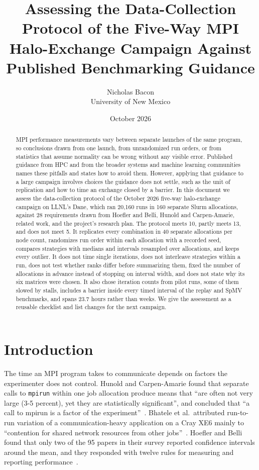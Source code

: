\documentclass[11pt]{article}
\title{Assessing the Data-Collection Protocol of the Five-Way MPI\\Halo-Exchange Campaign Against Published Benchmarking Guidance}
\author{Nicholas Bacon\\University of New Mexico}
\date{October 2026}
\begin{document}
\maketitle

\begin{abstract}
MPI performance measurements vary between separate launches of the same program, so
conclusions drawn from one launch, from unrandomized run orders, or from statistics that
assume normality can be wrong without any visible error. Published guidance from HPC and
from the broader systems and machine learning communities names these pitfalls and
states how to avoid them. However, applying that guidance to a large campaign involves
choices the guidance does not settle, such as the unit of replication and how to time an
exchange closed by a barrier. In this document we assess the data-collection protocol of
the October 2026 five-way halo-exchange campaign on LLNL's Dane, which ran 20,160 runs in
160 separate Slurm allocations, against 28 requirements drawn from Hoefler and Belli,
Hunold and Carpen-Amarie, related work, and the project's research plan. The protocol
meets 10, partly meets 13, and does not meet 5. It replicates every combination in 40
separate allocations per node count, randomizes run order within each allocation with a
recorded seed, compares strategies with medians and intervals resampled over
allocations, and keeps every outlier. It does not time single iterations, does not
interleave strategies within a run, does not test whether ranks differ before
summarizing them, fixed the number of allocations in advance instead of stopping on
interval width, and does not state why its six matrices were chosen. It also chose
iteration counts from pilot runs, some of them slowed by stalls, includes a barrier inside
every timed interval of the replay and SpMV benchmarks, and spans 23.7 hours rather than
weeks. We give
the assessment as a reusable checklist and list changes for the next campaign.
\end{abstract}

\section{Introduction}

The time an MPI program takes to communicate depends on factors the experimenter does
not control. Hunold and Carpen-Amarie found that separate calls to \texttt{mpirun} within
one job allocation produce means that ``are often not very large (3-5 percent), yet they
are statistically significant'', and concluded that ``a call to mpirun is a factor of the
experiment''~\cite{hunold2016reproducible}. Bhatele et al.\ attributed run-to-run
variation of a communication-heavy application on a Cray XE6 mainly to ``contention for
shared network resources from other jobs''~\cite{bhatele2013there}. Hoefler and Belli
found that only two of the 95 papers in their survey reported confidence intervals
around the mean, and they responded with twelve rules for measuring and reporting
performance~\cite{hoefler2015scientific}.
\end{document}
